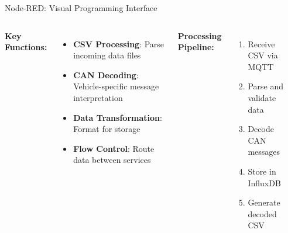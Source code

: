 \documentclass[aspectratio=169]{beamer}
\begin{document}
\begin{frame}{Node-RED: Visual Programming Interface}
\begin{columns}
\textbf{Key Functions:}
\begin{itemize}
    \item \textbf{CSV Processing}: Parse incoming data files
    \item \textbf{CAN Decoding}: Vehicle-specific message interpretation
    \item \textbf{Data Transformation}: Format for storage
    \item \textbf{Flow Control}: Route data between services
\end{itemize}

\textbf{Processing Pipeline:}
\begin{enumerate}
    \item Receive CSV via MQTT
    \item Parse and validate data
    \item Decode CAN messages
    \item Store in InfluxDB
    \item Generate decoded CSV
\end{enumerate}

\begin{center}
\end{center}
\end{columns}
\end{frame}
\end{document}

